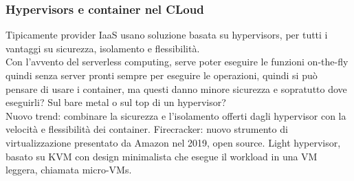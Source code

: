 \documentclass[16px]{article}
\begin{document}
\subsubsection{Hypervisors e container nel CLoud}
Tipicamente provider IaaS usano soluzione basata su hypervisors, per tutti i vantaggi su sicurezza, isolamento e flessibilità.\\ Con l'avvento del serverless computing, serve poter eseguire le funzioni on-the-fly quindi senza server pronti sempre per eseguire le operazioni, quindi si può pensare di usare i container, ma questi danno minore sicurezza e sopratutto dove eseguirli? Sul bare metal o sul top di un hypervisor?\\ Nuovo trend: combinare la sicurezza e l'isolamento offerti dagli hypervisor con la velocità e flessibilità dei container. Firecracker: nuovo strumento di virtualizzazione presentato da Amazon nel 2019, open source. Light hypervisor, basato su KVM con design minimalista che esegue il workload in una VM leggera, chiamata micro-VMs.
\end{document}
